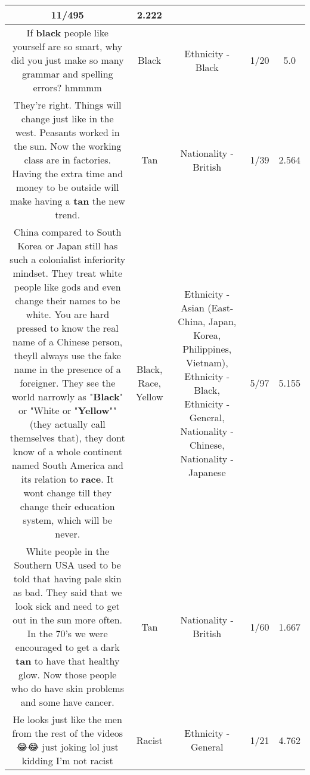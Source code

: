 \documentclass[11pt]{article}
\newlength\mylength
\begin{document}
\begin{center}
\begin{longtable}{|C{.65\mylength}|C{.30\mylength}|C{.12\mylength}|C{.12\mylength}|C{.12\mylength}|}
11/495 & 2.222 \\  \hline
  \small If \textbf{black} people like yourself are so smart, why did you just make so many grammar and spelling errors? hmmmm\normalsize   & Black & Ethnicity - Black & 1/20 & 5.0 \\  \hline
  \small They're right. Things will change just like in the west. Peasants worked in the sun. Now the working class are in factories. Having the extra time and money to be outside will make having a \textbf{tan} the new trend.\normalsize   & Tan & Nationality - British & 1/39 & 2.564 \\  \hline
  \small China compared to South Korea or Japan still has such a colonialist inferiority mindset. They treat white people like gods and even change their names to be white. You are hard pressed to know the real name of a Chinese person, theyll always use the fake name in the presence of a foreigner. They see the world narrowly as "\textbf{Black}" or "White or "\textbf{Y\textbf{e\textbf{llow}}}"" (they actually call themselves that), they dont know of a whole continent named South America and its relation to \textbf{race}. It wont change till they change their education system, which will be never.\normalsize   & Black, Race, Yellow & Ethnicity - Asian (East- China, Japan, Korea, Philippines, Vietnam), Ethnicity - Black, Ethnicity - General, Nationality - Chinese, Nationality - Japanese & 5/97 & 5.155 \\  \hline
  \small White people in the Southern USA used to be told that having pale skin as bad. They said that we look sick and need to get out in the sun more often. In the 70's we were encouraged  to get a dark \textbf{tan} to have that healthy glow. Now those people who do have skin problems and some have cancer.\normalsize   & Tan & Nationality - British & 1/60 & 1.667 \\  \hline
  \small He looks just like the men from the rest of the videos 😂😂 just joking lol just kidding I'm not racist\normalsize   & Racist & Ethnicity - General & 1/21 & 4.762 \\  \hline

\end{longtable}
\end{center}
\end{document}
